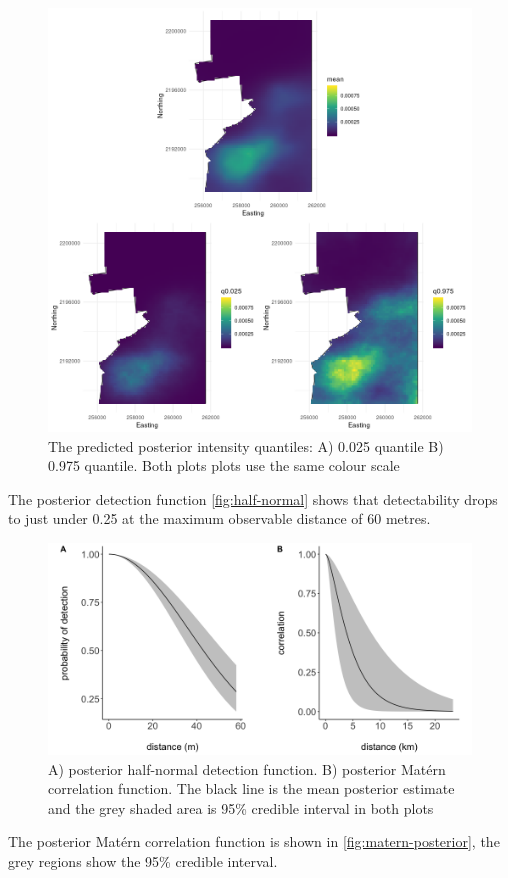 \documentclass[preprint,12pt]{elsarticle}
\begin{document}
\begin{figure}[h]
	\begin{center}
		\includegraphics[scale=0.525]{figures/intensity_quantiles.png}
		\caption{The predicted posterior intensity quantiles:  A) 0.025 quantile B) 0.975 quantile.  Both plots plots use the same colour scale}
		\label{fig:intensity-quantiles}
	\end{center}
\end{figure}

The posterior detection function \autoref{fig:half-normal} shows that detectability drops to just under 0.25 at the maximum observable distance of 60 metres.
\begin{figure}[h]
	\begin{center}
		\includegraphics[scale=0.525]{figures/detfn_and_matern.png}
		\caption{A) posterior half-normal detection function. B) posterior Mat\'ern correlation function.  The black line is the mean posterior estimate and the grey shaded area is 95\% credible interval in both plots}
		\label{fig:half-normal}
	\end{center}
\end{figure}
The posterior Mat\'ern correlation function is shown in \autoref{fig:matern-posterior}, the grey regions show the 95\% credible interval. 
\end{document}
